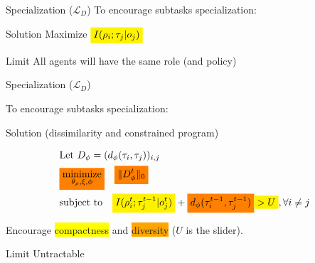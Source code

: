 \documentclass{beamer}
\newcommand{\mathcolorbox}[2]{\colorbox{#1}{$\displaystyle #2$}}
\begin{document}
    \begin{frame}{Specialization ($\mathcal{L}_{D}$)}
        To encourage subtasks specialization:
        \pause
        \begin{exampleblock}{Solution}
            Maximize $\mathcolorbox {yellow}{I(\rho_i;\tau_j| o_j)}$
        \end{exampleblock}
        \pause
        \begin{alertblock}{Limit}
            All agents will have the same role (and policy)
        \end{alertblock}
    \end{frame}
    \begin{frame}{Specialization ($\mathcal{L}_{D}$)}

        To encourage subtasks specialization:

        \begin{exampleblock}{Solution (dissimilarity and constrained program)}

            \begin{align*}
                & \text{Let}\ {D_\phi=(d_{\phi}(\tau_i,\tau_j))_{i,j}}\\
                &\mathcolorbox{orange}{\underset{{\theta_\rho, \xi, \phi}}{\text{minimize}}} \ \ \ \mathcolorbox {orange}{\|D_\phi^t\|_{0}} \\
                &\text{subject to} \ \ \ \mathcolorbox {yellow}{I(\rho^{t}_i; \tau^{t-1}_j|o^t_j)} + \mathcolorbox {orange}{d_\phi(\tau^{t-1}_i, \tau^{t-1}_j)} \mathcolorbox {yellow}{>U}, \forall i\ne j
            \end{align*}

%
        \end{exampleblock}

        \pause
        \begin{block}{}
            Encourage \colorbox{yellow}{compactness} and \colorbox{orange}{diversity} ($U$ is the slider).
        \end{block}
        \pause
        \begin{alertblock}{Limit}
            Untractable
        \end{alertblock}
    \end{frame}
\end{document}
